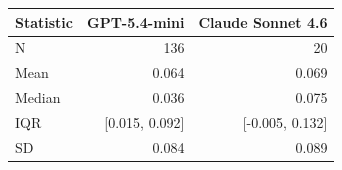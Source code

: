 \begin{tabular}{@{}l r r@{}}
\toprule
Statistic & GPT-5.4-mini & Claude Sonnet 4.6 \\
\midrule
N & 136 & 20 \\
Mean & 0.064 & 0.069 \\
Median & 0.036 & 0.075 \\
IQR & [0.015, 0.092] & [-0.005, 0.132] \\
SD & 0.084 & 0.089 \\
\bottomrule
\end{tabular}